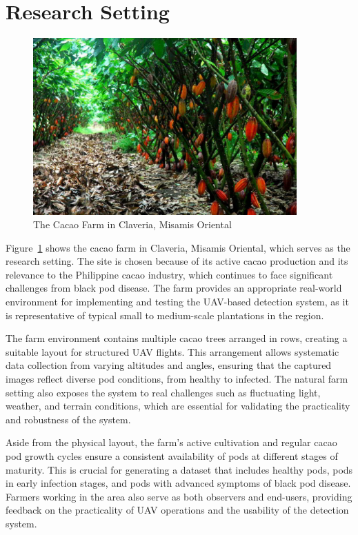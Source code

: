 \section{Research Setting}
\begin{figure}[H]
	\centering
	\caption{The Cacao Farm in Claveria, Misamis Oriental}
	\label{fig:cacao_farm}
	\includegraphics[width=0.9\textwidth]{figures/Cacao_Farm.pdf}
\end{figure}

Figure~\ref{fig:cacao_farm} shows the cacao farm in Claveria, Misamis Oriental, which serves as the research setting. 
The site is chosen because of its active cacao production and its relevance to the Philippine cacao industry, which continues to face significant challenges from black pod disease. 
The farm provides an appropriate real-world environment for implementing and testing the UAV-based detection system, as it is representative of typical small to medium-scale plantations in the region.

The farm environment contains multiple cacao trees arranged in rows, creating a suitable layout for structured UAV flights. 
This arrangement allows systematic data collection from varying altitudes and angles, ensuring that the captured images reflect diverse pod conditions, from healthy to infected. 
The natural farm setting also exposes the system to real challenges such as fluctuating light, weather, and terrain conditions, which are essential for validating the practicality and robustness of the system.

Aside from the physical layout, the farm’s active cultivation and regular cacao pod growth cycles ensure a consistent availability of pods at different stages of maturity. 
This is crucial for generating a dataset that includes healthy pods, pods in early infection stages, and pods with advanced symptoms of black pod disease. 
Farmers working in the area also serve as both observers and end-users, providing feedback on the practicality of UAV operations and the usability of the detection system.


